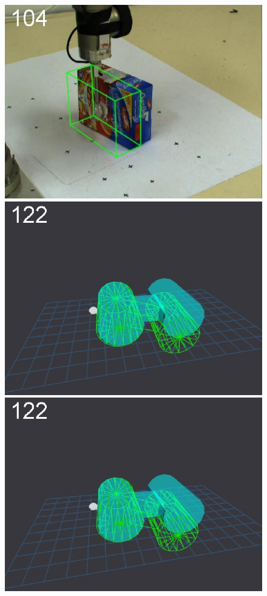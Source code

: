 \begin{figure}[t]
{\includegraphics[width=\imgCXwid]{./C1_LWPR1_87_2}
\includegraphics[width=\imgCXwid]{./C5_1exp_6_2}
\includegraphics[width=\imgCXwid]{./C5_2exp_6_2}
}
\end{figure}
